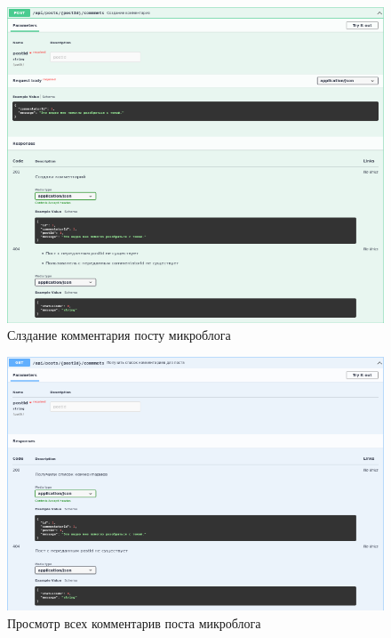 \documentclass[12pt, a4paper, simple]{eskdtext}
\begin{document}
  \begin{figure}[p!h]
    \centering
    \includegraphics[width=14cm]
    {images/SwaggerUi/2023-02-25_18-13-12.png}
    \caption{Слздание комментария посту микроблога}
    \label{fig:more_7}
  \end{figure}

  \begin{figure}[p!h]
    \centering
    \includegraphics[width=14cm]
    {images/SwaggerUi/2023-02-25_18-14-19.png}
    \caption{Просмотр всех комментарив поста микроблога}
    \label{fig:more_8}
  \end{figure}
\end{document}
